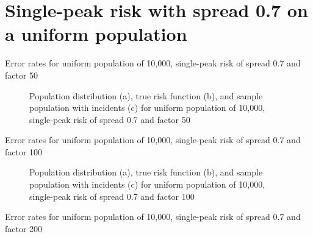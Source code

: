 {\section{Single-peak risk with spread 0.7 on a uniform population}
\label{sec:app:results_unif_0.7_1h}


\begin{table}[H]
    
    \caption[]{Error rates for uniform population of 10,000, single-peak risk of spread 0.7 and \gls{factor} 50}
    \label{tab:mean_error_rates:unif_50_0.7_1h}
\end{table}

\begin{figure}[H]
    
    \caption[]{Population distribution (a), true risk function (b), and sample population with incidents (c) for uniform population of 10,000, single-peak risk of \gls{spread} 0.7 and \gls{factor} 50}
    \label{fig:distributions:unif_50_0.7_1h}    
\end{figure} \newpage



\begin{table}[H]

\caption[]{Error rates for uniform population of 10,000, single-peak risk of \gls{spread} 0.7 and \gls{factor} 100}
\label{tab:mean_error_rates:unif_100_0.7_1h}
\end{table}

\begin{figure}[H]
    
    \caption[]{Population distribution (a), true risk function (b), and sample population with incidents (c) for uniform population of 10,000, single-peak risk of \gls{spread} 0.7 and \gls{factor} 100}
    \label{fig:distributions:unif_100_0.7_1h}    
\end{figure} \newpage



\begin{table}[H]

\caption[]{Error rates for uniform population of 10,000, single-peak risk of \gls{spread} 0.7 and \gls{factor} 200}
\label{tab:mean_error_rates:unif_200_0.7_1h}
\end{table}

}
